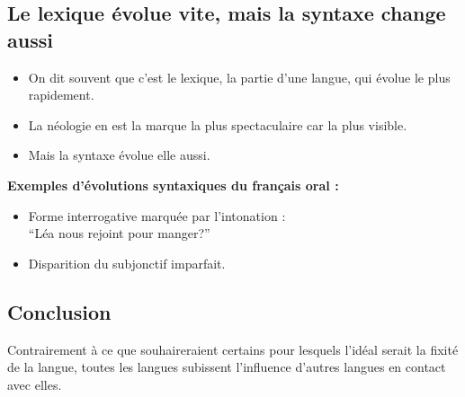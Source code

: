 \subsection{Le lexique évolue vite, mais la syntaxe change aussi}
\begin{itemize}
         \item On dit souvent que c'est le lexique, la partie d'une langue, qui évolue le plus rapidement.
         \item La néologie en est la marque la plus spectaculaire car la plus visible. 
         \item Mais la syntaxe évolue elle aussi.
\end{itemize}

\textbf{Exemples d'évolutions syntaxiques du français oral :}
\begin{itemize}
         \item Forme interrogative marquée par l'intonation : \\
            \enquote{Léa nous rejoint pour manger?}
         \item Disparition du subjonctif imparfait.
\end{itemize}

\subsection{Conclusion}
Contrairement à ce que souhaireraient certains pour lesquels l'idéal serait la fixité de la langue, toutes les langues subissent l'influence d'autres langues en contact avec elles.







